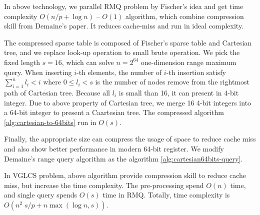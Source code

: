 In above technology, we parallel RMQ problem by Fischer's idea and get
time complexity $O(n / p + \log n)$ -- $O(1)$ algorithm, which combine
compression skill from Demaine's paper. It reduces cache-miss and run in
ideal complexity.

\iffalse
在上述的技術中，我們可以藉由 Fischer 提出的方案平行化 RMQ 至 $O(n / p + \log n)$ -- $O(1)$，使用 Demaine 提供的技巧壓縮空間使用量，降低快取未中以提升運行效能。這裡我們挑選固定長度的壓縮方案 $s = 16$，其能解決序列長度為 $n = 2^{64}$ 的區間查找，將 16 個整數壓縮成一棵笛卡爾樹。在第 $i$ 次插入時，左旋的次數 $l_i$，每次操作皆符合 $\sum_{i=1}^{n} l_i < i$。
\fi

The compressed sparse table is composed of Fischer's sparse table and
Cartesian tree, and we replace look-up operation to small brute
operation.  We pick the fixed length $s = 16$, which can solve $n =
2^{64}$ one-dimension range maximum query.  When inserting $i$-th
elements, the number of $i$-th insertion satisfy $\sum_{i=1}^{n} l_i <
i$ where $0 \le l_i < s$ is the number of nodes remove from the
rightmost path of Cartesian tree.  Because all $l_i$ is small than 16,
it can present in 4-bit integer.  Due to above property of Cartesian
tree, we merge 16 4-bit integers into a 64-bit integer to present a
Caartesian tree. The compressed algorithm \ref{alg:cartesian-to-64bits}
run in $O(s)$.

Finally, the appropriate size can compress the usage of space to
reduce cache miss and also show better performance in modern 64-bit
register.  We modify Demaine's range query algorithm as the algorithm
\ref{alg:cartesian64bits-query}.

\iffalse
因所有 $l_i < 16$，使得每個 $l_i$ 可用 4-bit 表示之，
整體便可用 64-bit 長整數表示一棵笛卡爾樹的狀態。
為了現在常見的 64-byte 快取列 (cache line) 和 64-bit 暫存器 (register) 考量，
我們選用合適的大小進行測試，不僅壓縮空間使用量，同時也減少快取未中的問題。
最後，我們得到壓縮算法 \ref{alg:cartesian-to-64bits}，其相對應的區間查找算法，
根據 Demaine \cite{demaine} 進行修改，得到壓縮下的詢問算法 \ref{alg:cartesian64bits-query}。
\fi





In VGLCS problem, above algorithm provide compression skill to reduce
cache miss, but increase the time complexity.  The pre-processing
spend $O(n)$ time, and single query spends $O(s)$ time in RMQ.
Totally, time complexity is $O(n^2 \; s / p + n \max(\log n, s))$.

\iffalse
回到 VGLCS 的應用中，上述算法使用壓縮方式降低快取未中。
我們可以使用上述的算法取代原先的并查集，建表的時間複雜度為 $O(n)$，
單一查詢的時間複雜度為 $O(s)$。
整體的時間複雜度為 $O(n^2 \; s / p + n \max(\log n, s))$。
\fi